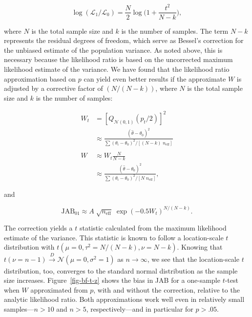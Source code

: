 \documentclass[
  man,
  floatsintext,
  longtable,
  nolmodern,
  notxfonts,
  notimes,
  colorlinks=true,linkcolor=blue,citecolor=blue,urlcolor=blue]{apa7}
\begin{document}
\[
\log(\mathcal{L}_{1} / \mathcal{L}_{0}) = \frac{N}{2}\log\bigg(1 + \frac{t^2}{N - k}\bigg),
\]

where \(N\) is the total sample size and \(k\) is the number of samples.
The term \(N - k\) represents the residual degrees of freedom, which
serve as Bessel's correction for the unbiased estimate of the population
variance. As noted above, this is necessary because the likelihood ratio
is based on the uncorrected maximum likelihood estimate of the variance.
We have found that the likelihood ratio approximation based on \(p\) can
yield even better results if the approximate \(W\) is adjusted by a
corrective factor of \((N / (N - k))\), where \(N\) is the total sample
size and \(k\) is the number of samples:

\[
\begin{aligned}
W_t & = \left[Q_{\mathcal{N(0,1)}}(p_t/2)\right]^2 \\
   & \approx \frac{(\hat \theta - \theta_0)^2}{\sum{(\theta_i - \theta_0)^2} / [(N - k) \; n_\text{eff}]} \\ \\
W & \approx W_t \frac{N}{N - k} \\
  & \approx \frac{(\hat \theta - \theta_0)^2}{\sum{(\theta_i - \theta_0)^2} / [N \; n_\text{eff}]},
\end{aligned}
\]

and

\[
\text{JAB}_{01} \approx A \; \sqrt{n_\text{eff}} \; \exp\left(-0.5 W_t\right)^{N/(N - k)}.
\]

The correction yields a \(t\) statistic calculated from the maximum
likelihood estimate of the variance. This statistic is known to follow a
location-scale \(t\) distribution with
\(t(\mu = 0, \tau^2 = N / (N - k), \nu = N - k)\). Knowing that
\(t(\nu = n - 1) \xrightarrow[]{D} \mathcal{N}(\mu = 0, \sigma^2 = 1)\)
as \(n \to \infty\), we see that the location-scale \(t\) distribution,
too, converges to the standard normal distribution as the sample size
increases. Figure~\ref{fig-bf-t-z} shows the bias in JAB for a
one-sample \(t\)-test when \(W\) approximated from \(p\), with and
without the correction, relative to the analytic likelihood ratio. Both
approximations work well even in relatively small samples---\(n > 10\)
and \(n > 5\), respectively---and in particular for \(p > .05\).
\end{document}
